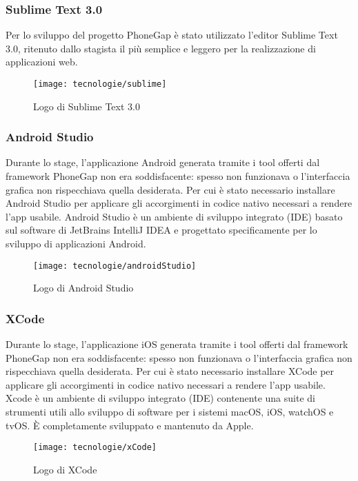 \subsubsection{Sublime Text 3.0}

Per lo sviluppo del progetto PhoneGap è stato utilizzato l'editor Sublime Text 3.0, ritenuto dallo stagista il più semplice e leggero per la realizzazione di applicazioni web. 

\begin{figure}[!h] 
    \centering 
    \texttt{[image: tecnologie/sublime]} 
    \caption{Logo di Sublime Text 3.0}
\end{figure}

\subsubsection{Android Studio}

Durante lo stage, l'applicazione Android generata tramite i tool offerti dal framework PhoneGap non era soddisfacente: spesso non funzionava o l'interfaccia grafica non rispecchiava quella desiderata. Per cui è stato necessario installare Android Studio per applicare gli accorgimenti in codice nativo necessari a rendere l'app usabile. Android Studio è un ambiente di sviluppo integrato (IDE) basato sul software di JetBrains IntelliJ IDEA e progettato specificamente per lo sviluppo di applicazioni Android.

\begin{figure}[!h] 
    \centering 
    \texttt{[image: tecnologie/androidStudio]} 
    \caption{Logo di Android Studio}
\end{figure}

\subsubsection{XCode}

Durante lo stage, l'applicazione iOS generata tramite i tool offerti dal framework PhoneGap non era soddisfacente: spesso non funzionava o l'interfaccia grafica non rispecchiava quella desiderata. Per cui è stato necessario installare XCode per applicare gli accorgimenti in codice nativo necessari a rendere l'app usabile. Xcode è un ambiente di sviluppo integrato (IDE) contenente una suite di strumenti utili allo sviluppo di software per i sistemi macOS, iOS, watchOS e tvOS. È completamente sviluppato e mantenuto da Apple.

\begin{figure}[!h] 
    \centering 
    \texttt{[image: tecnologie/xCode]} 
    \caption{Logo di XCode}
\end{figure}


